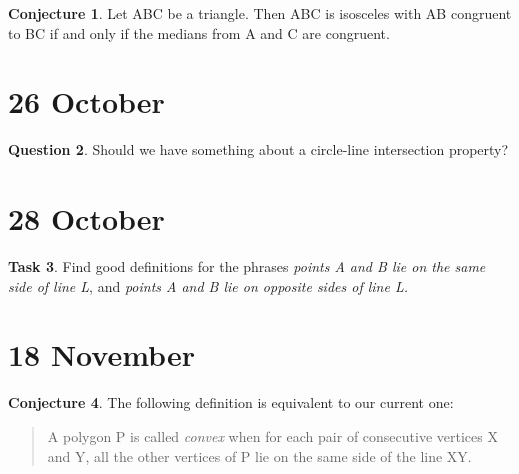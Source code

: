 \documentclass{amsart}
\theoremstyle{definition}
\newtheorem{conjecture}{Conjecture}
\newtheorem{question}[conjecture]{Question}
\newtheorem{task}[conjecture]{Task}
\begin{document}
\begin{conjecture} Let ABC be a triangle. Then ABC is isosceles with AB congruent to BC if and only if the medians from A and C are congruent.
\end{conjecture}

\section*{26 October}

\begin{question} Should we have something about a circle-line intersection property?
\end{question}

\section*{28 October}

\begin{task} 
Find good definitions for the phrases \emph{points A and B lie on
the same side of line L}, and \emph{points A and B lie on opposite 
sides of line L.}
\end{task}




\section*{18 November}

\begin{conjecture} The following definition is equivalent to our current
one: 
\begin{quote}
A polygon P is called \emph{convex} when for each pair of consecutive vertices
X and Y, all the other vertices of P lie on the same side of the line XY.
\end{quote}
\end{conjecture}
\end{document}
